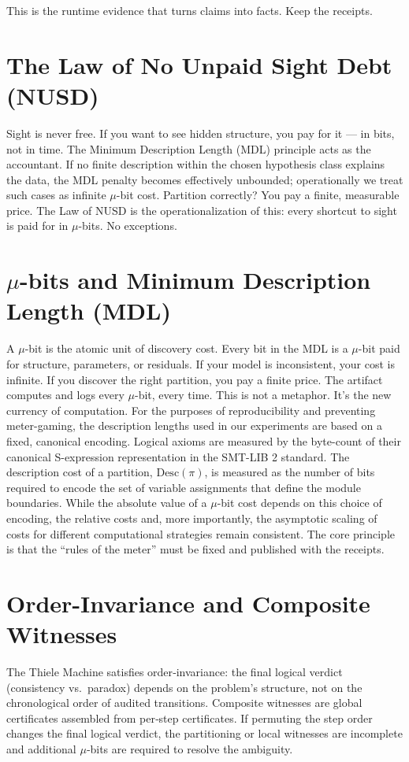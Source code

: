 \documentclass[11pt]{article}
\begin{document}
This is the runtime evidence that turns claims into facts. Keep the receipts.

\section{The Law of No Unpaid Sight Debt (NUSD)}
Sight is never free. If you want to see hidden structure, you pay for it — in bits, not in time. The Minimum Description Length (MDL) principle acts as the accountant. If no finite description within the chosen hypothesis class explains the data, the MDL penalty becomes effectively unbounded; operationally we treat such cases as infinite $\mu$-bit cost. Partition correctly? You pay a finite, measurable price. The Law of NUSD is the operationalization of this: every shortcut to sight is paid for in $\mu$-bits. No exceptions.

\section{$\mu$-bits and Minimum Description Length (MDL)}
A $\mu$-bit is the atomic unit of discovery cost. Every bit in the MDL is a $\mu$-bit paid for structure, parameters, or residuals. If your model is inconsistent, your cost is infinite. If you discover the right partition, you pay a finite price. The artifact computes and logs every $\mu$-bit, every time. This is not a metaphor. It’s the new currency of computation.
For the purposes of reproducibility and preventing meter-gaming, the description lengths used in our experiments are based on a fixed, canonical encoding. Logical axioms are measured by the byte-count of their canonical S-expression representation in the SMT-LIB 2 standard. The description cost of a partition, $\mathrm{Desc}(\pi)$, is measured as the number of bits required to encode the set of variable assignments that define the module boundaries. While the absolute value of a $\mu$-bit cost depends on this choice of encoding, the relative costs and, more importantly, the asymptotic scaling of costs for different computational strategies remain consistent. The core principle is that the ``rules of the meter'' must be fixed and published with the receipts.

\section{Order-Invariance and Composite Witnesses}
The Thiele Machine satisfies order‑invariance: the final logical verdict (consistency vs.\ paradox) depends on the problem's structure, not on the chronological order of audited transitions. Composite witnesses are global certificates assembled from per‑step certificates. If permuting the step order changes the final logical verdict, the partitioning or local witnesses are incomplete and additional $\mu$‑bits are required to resolve the ambiguity.
\end{document}
